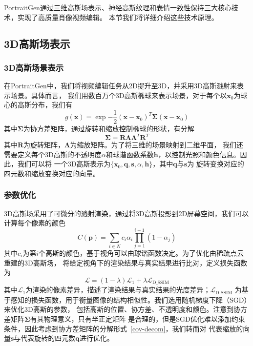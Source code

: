 PortraitGen通过三维高斯场表示、神经高斯纹理和表情一致性保持三大核心技术，实现了高质量肖像视频编辑。
本节我们将详细介绍这些技术原理。

\subsection{3D高斯场表示}

\subsubsection{3D高斯场景表示}
在PortraitGen中，我们将视频编辑任务从2D提升至3D，并采用3D高斯溅射\cite{kerbl20233d}来表示场景。具体而言，
我们用数百万个3D高斯椭球来表示场景，对于每个以$\symbf{x}_0$为球心的高斯分布，我们有
\begin{equation}
    g(\symbf{x})=\exp{-\frac{1}{2}(\symbf{x}-\symbf{x}_0)^T\symbf{\Sigma}(\symbf{x}-\symbf{x}_0)}
\end{equation}
其中$\symbf{\Sigma}$为协方差矩阵，通过旋转和缩放控制椭球的形状，有分解
\begin{equation}
    \symbf{\Sigma}=\symbf{R}\symbf{\Lambda}\symbf{\Lambda}^T\symbf{R}^T
    \label{cov-decom}
\end{equation}
其中$\symbf{R}$为旋转矩阵，$\symbf{\Lambda}$为缩放矩阵。为了将三维的场景映射到二维平面，
我们还需要定义每个3D高斯的不透明度$\alpha$和球谐函数系数$\symbf{h}$，以控制光照和颜色信息。因此，我们可以将
一个3D高斯表示为$\{\symbf{x}_0,\symbf{q},\symbf{s},\alpha,\symbf{h} \}$，其中$\symbf{q}$与$\symbf{s}$为
旋转变换对应的四元数和缩放变换对应的向量。

\subsubsection{参数优化}
3D高斯场采用了可微分的溅射渲染，通过将3D高斯投影到2D屏幕空间，我们可以计算每个像素的颜色
\begin{equation}
    C(\symbf{p})=\sum_{i\in N}c_i\alpha_i\prod_{j=1}^{i-1}(1-\alpha_j)
\end{equation}
其中$c_i$为第$i$个高斯的颜色，基于视角可以由球谐函数决定。为了优化由稀疏点云重建的3D高斯场，
将给定视角下的渲染结果与真实结果进行比对，定义损失函数为
\begin{equation}
    \mathcal{L}=(1-\lambda)\mathcal{L}_1+\lambda\mathcal{L}_\text{D\_SSIM}
\end{equation}
其中$\mathcal{L}_1$为渲染的像素差异，描述了渲染结果与真实结果的光度差异；$\mathcal{L}_\text{D\_SSIM}$
为基于感知的损失函数，用于衡量图像的结构相似性。我们选用随机梯度下降（SGD）来优化3D高斯的参数，
包括高斯的位置、协方差、不透明度和颜色。注意到协方差矩阵$\symbf{\Sigma}$有其物理意义，只有半正定矩阵
是合理的，但是SGD优化难以添加约束条件，因此考虑到协方差矩阵的分解形式~\eqref{cov-decom}，我们转而对
代表缩放的向量$\symbf{s}$与代表旋转的四元数$\symbf{q}$进行优化。

